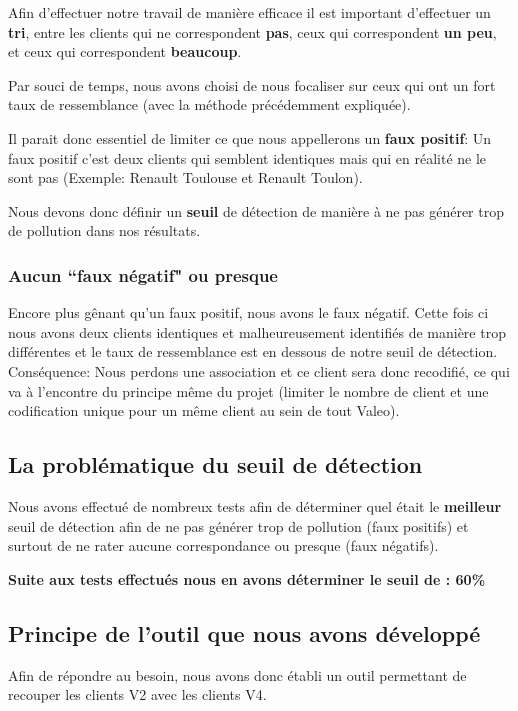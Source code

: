 Afin d'effectuer notre travail de manière efficace il est important d'effectuer un \textbf{tri}, entre les clients qui ne correspondent \textbf{pas}, ceux qui correspondent \textbf{un peu}, et ceux qui correspondent \textbf{beaucoup}.

Par souci de temps, nous avons choisi de nous focaliser sur ceux qui ont un fort taux de ressemblance (avec la méthode précédemment expliquée).

Il parait donc essentiel de limiter ce que nous appellerons un \textbf{faux positif}:
Un faux positif c'est deux clients qui semblent identiques mais qui en réalité ne le sont pas (Exemple: Renault Toulouse et Renault Toulon).

Nous devons donc définir un \textbf{seuil} de détection de manière à ne pas générer trop de pollution dans nos résultats.

\subsubsection{Aucun ``faux négatif" ou presque}

Encore plus gênant qu'un faux positif, nous avons le faux négatif. Cette fois ci nous avons deux clients identiques et malheureusement identifiés de manière trop différentes et le taux de ressemblance est en dessous de notre seuil de détection. Conséquence: Nous perdons une association et ce client sera donc recodifié, ce qui va à l'encontre du principe même du projet (limiter le nombre de client et une codification unique pour un même client au sein de tout Valeo).

\subsection{La problématique du seuil de détection}

Nous avons effectué de nombreux tests afin de déterminer quel était le \textbf{meilleur} seuil de détection afin de ne pas générer trop de pollution (faux positifs) et surtout de ne rater aucune correspondance ou presque (faux négatifs).

\textbf{Suite aux tests effectués nous en avons déterminer le seuil de : 60\%}

\subsection{Principe de l'outil que nous avons développé}

Afin de répondre au besoin, nous avons donc établi un outil permettant de recouper les clients V2 avec les clients V4.

